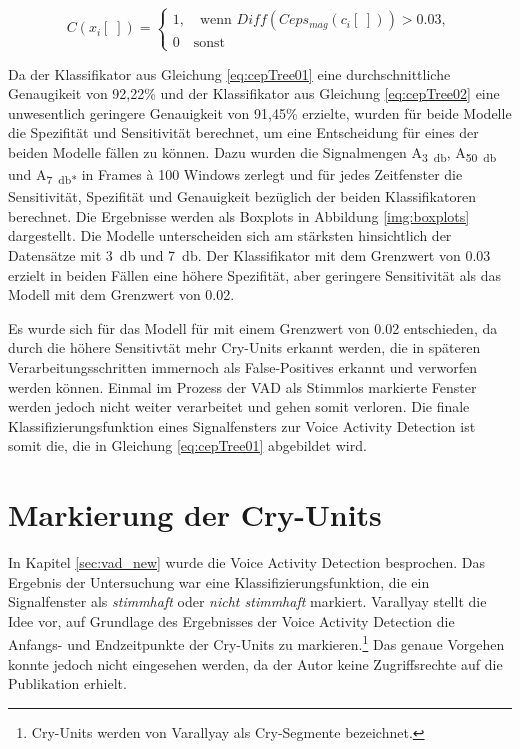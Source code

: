 \begin{equation}
C(x_i[\;]) = \begin{cases}
1, \quad \text{wenn } Diff(Ceps_{mag}(c_i[\;])) > 0.03, \\
0 \quad \text{sonst}
\end{cases}
\label{eq:cepTree02}
\end{equation}

Da der Klassifikator aus Gleichung \ref{eq:cepTree01} eine durchschnittliche Genaugikeit von 92,22\% und der Klassifikator aus Gleichung \ref{eq:cepTree02} eine unwesentlich geringere Genauigkeit von 91,45\% erzielte, wurden für beide Modelle die Spezifität und Sensitivität berechnet, um eine Entscheidung für eines der beiden Modelle fällen zu können. Dazu wurden die Signalmengen A\textsubscript{\SI{3}{\decibel}}, A\textsubscript{\SI{50}{\decibel}} und A\textsubscript{\SI{7}{\decibel}*} in Frames \`{a} 100 Windows zerlegt und für jedes Zeitfenster die Sensitivität, Spezifität und Genauigkeit bezüglich der beiden Klassifikatoren berechnet. Die Ergebnisse werden als Boxplots in Abbildung \ref{img:boxplots} dargestellt. Die Modelle unterscheiden sich am stärksten hinsichtlich der Datensätze mit \SI{3}{\decibel} und \SI{7}{\decibel}. Der Klassifikator mit dem Grenzwert von 0.03 erzielt in beiden Fällen eine höhere Spezifität, aber geringere Sensitivität als das Modell mit dem Grenzwert von 0.02. 

Es wurde sich für das Modell für mit einem Grenzwert von 0.02 entschieden, da durch die höhere Sensitivtät mehr Cry-Units erkannt werden, die in späteren Verarbeitungsschritten immernoch als False-Positives erkannt und verworfen werden können. Einmal im Prozess der VAD als Stimmlos markierte Fenster werden jedoch nicht weiter verarbeitet und gehen somit \glqq verloren\grqq. Die finale Klassifizierungsfunktion eines Signalfensters zur Voice Activity Detection ist somit die, die in Gleichung \ref{eq:cepTree01} abgebildet wird.


\section{Markierung der Cry-Units}
\label{sec:marking_cry-units_new}

In Kapitel \ref{sec:vad_new} wurde die Voice Activity Detection besprochen. Das Ergebnis der Untersuchung war eine Klassifizierungsfunktion, die ein Signalfenster als \emph{stimmhaft} oder \emph{nicht stimmhaft} markiert. Varallyay \cite[S. 16 - 17]{cry_thesis} stellt die Idee vor, auf Grundlage des Ergebnisses der Voice Activity Detection die Anfangs- und Endzeitpunkte der Cry-Units zu markieren.\footnote{\glqq Cry-Units \grqq{} werden von Varallyay als \glqq Cry-Segmente \grqq{} bezeichnet.} Das genaue Vorgehen konnte jedoch nicht eingesehen werden, da der Autor keine Zugriffsrechte auf die Publikation erhielt.

